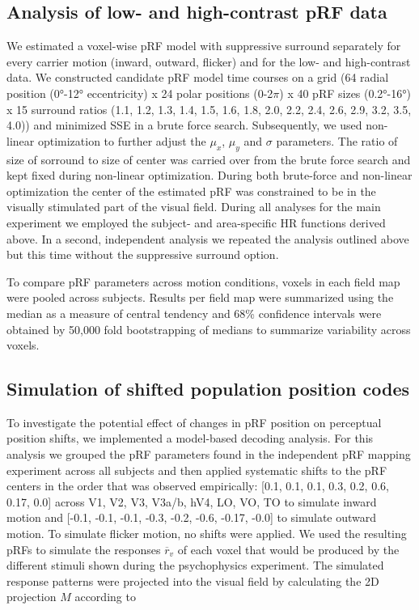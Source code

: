 \subsection{Analysis of low- and high-contrast pRF data}
We estimated a voxel-wise pRF model with suppressive surround separately for every carrier motion (inward, outward, flicker) and for the low- and high-contrast data. We constructed candidate pRF model time courses on a grid (64 radial position (0°-12° eccentricity) x 24 polar positions (0-2$\pi$) x 40 pRF sizes (0.2°-16°) x 15 surround ratios (1.1, 1.2, 1.3, 1.4, 1.5, 1.6, 1.8, 2.0, 2.2, 2.4, 2.6, 2.9, 3.2, 3.5, 4.0)) and minimized SSE in a brute force search. Subsequently, we used non-linear optimization to further adjust the $\mu_x$, $\mu_y$ and $\sigma$ parameters. The ratio of size of sorround to size of center was carried over from the brute force search and kept fixed during non-linear optimization. During both brute-force and non-linear optimization the center of the estimated pRF was constrained to be in the visually stimulated part of the visual field. During all analyses for the main experiment we employed the subject- and area-specific HR functions derived above. In a second, independent analysis we repeated the analysis outlined above but this time without the suppressive surround option.

To compare pRF parameters across motion conditions, voxels in each field map were pooled across subjects. Results per field map were summarized using the median as a measure of central tendency and 68\% confidence intervals were obtained by 50,000 fold bootstrapping of medians to summarize variability across voxels.

\subsection{Simulation of shifted population position codes}
To investigate the potential effect of changes in pRF position on perceptual position shifts, we implemented a model-based decoding analysis. For this analysis we grouped the pRF parameters found in the independent pRF mapping experiment across all subjects and then applied systematic shifts to the pRF centers in the order that was observed empirically: [0.1, 0.1, 0.1, 0.3, 0.2, 0.6, 0.17, 0.0] across V1, V2, V3, V3a/b, hV4, LO, VO, TO to simulate inward motion and [-0.1, -0.1, -0.1, -0.3, -0.2, -0.6, -0.17, -0.0] to simulate outward motion. To simulate flicker motion, no shifts were applied. We used the resulting pRFs to simulate the responses $\overline{r}_v$ of each voxel that would be produced by the different stimuli shown during the psychophysics experiment. The simulated response patterns were projected into the visual field by calculating the 2D projection $M$ according to


